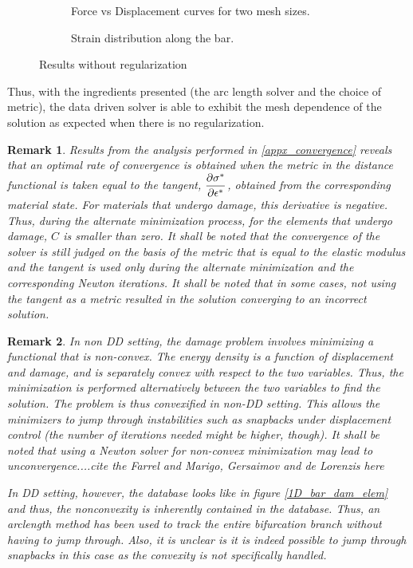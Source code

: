 \documentclass[12pt]{elsarticle}
\newtheorem*{remark}{Remark}
\begin{document}
\begin{figure}[ht]
	\begin{subfigure}{0.45\textwidth}
		\centering
		
		\caption{Force vs Displacement curves for two mesh sizes.}
		\label{force_disp_local}
	\end{subfigure}
	\hfill
	\begin{subfigure}{0.45\textwidth}
		\centering
		
		\caption{Strain distribution along the bar.}
		\label{strain_dist_local}
	\end{subfigure}
	\caption{Results without regularization}
	\label{fig:Results_without_regularization}
\end{figure}



Thus, with the ingredients presented (the arc length solver and the choice of metric), the data driven solver is able to exhibit the mesh dependence of the solution as expected when there is no regularization.

\begin{remark}
	Results from the analysis performed in \ref{appx_convergence} reveals that an optimal rate of convergence is obtained when the metric in the distance functional is taken equal to the tangent, ${\dfrac{\partial \sigma^*}{\partial \epsilon^*}}$, obtained from the corresponding material state. For materials that undergo damage, this derivative is negative. Thus, during the alternate minimization process, for the elements that undergo damage, $C$ is smaller than zero. It shall be noted that the convergence of the solver is still judged on the basis of the metric that is equal to the elastic modulus and the tangent is used only during the alternate minimization and the corresponding Newton iterations. It shall be noted that in some cases, not using the tangent as a metric resulted in the solution converging to an \textit{incorrect} solution.
\end{remark}

\begin{remark}
	In non DD setting, the damage problem involves minimizing a functional that is non-convex. The energy density is a function of displacement and damage, and is separately convex with respect to the two variables. Thus, the minimization is performed alternatively between the two variables to find the solution. The problem is thus \textit{convexified} in non-DD setting. This allows the minimizers to \textit{jump through} instabilities such as snapbacks under displacement control (the number of iterations needed might be higher, though). It shall be noted that using a Newton solver for non-convex minimization may lead to unconvergence....cite the Farrel and Marigo, Gersaimov and de Lorenzis here
	
	In DD setting, however, the database looks like in figure \ref{1D_bar_dam_elem} and thus, the nonconvexity is inherently contained in the database. Thus, an arclength method has been used to track the entire bifurcation branch without having to jump through. Also, it is unclear is it is indeed possible to jump through snapbacks in this case as the convexity is not specifically handled. 
\end{remark}
\end{document}
